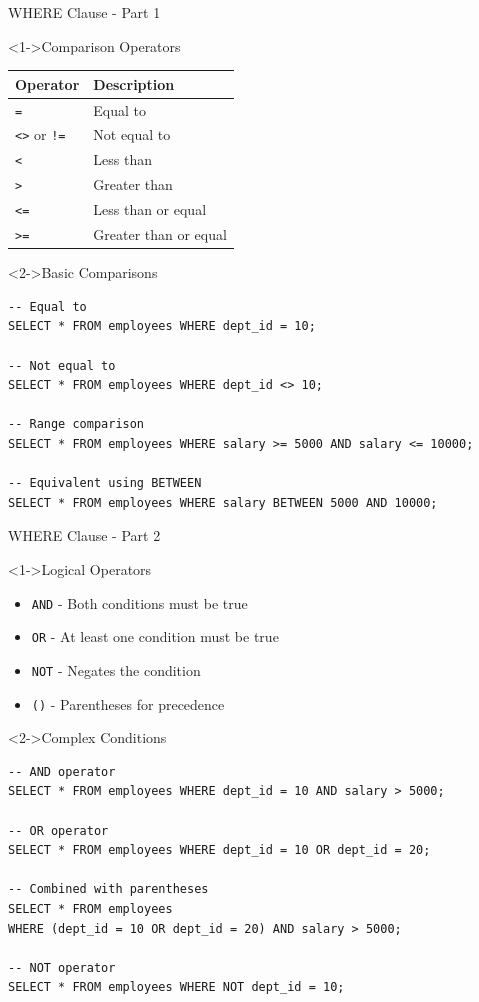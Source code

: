 \documentclass[aspectratio=169,11pt]{beamer}
\begin{document}
\begin{frame}[fragile]{WHERE Clause - Part 1}
\begin{block}<1->{Comparison Operators}
\begin{center}
\begin{tabular}{ll}
\toprule
\textbf{Operator} & \textbf{Description} \\
\midrule
\texttt{=} & Equal to \\
\texttt{<>} or \texttt{!=} & Not equal to \\
\texttt{<} & Less than \\
\texttt{>} & Greater than \\
\texttt{<=} & Less than or equal \\
\texttt{>=} & Greater than or equal \\
\bottomrule
\end{tabular}
\end{center}
\end{block}

\pause
\begin{exampleblock}<2->{Basic Comparisons}
\begin{lstlisting}
-- Equal to
SELECT * FROM employees WHERE dept_id = 10;

-- Not equal to
SELECT * FROM employees WHERE dept_id <> 10;

-- Range comparison
SELECT * FROM employees WHERE salary >= 5000 AND salary <= 10000;

-- Equivalent using BETWEEN
SELECT * FROM employees WHERE salary BETWEEN 5000 AND 10000;
\end{lstlisting}
\end{exampleblock}
\end{frame}

\begin{frame}[fragile]{WHERE Clause - Part 2}
\begin{block}<1->{Logical Operators}
\begin{itemize}
    \item \texttt{AND} - Both conditions must be true
    \item \texttt{OR} - At least one condition must be true
    \item \texttt{NOT} - Negates the condition
    \item \texttt{()} - Parentheses for precedence
\end{itemize}
\end{block}

\pause
\begin{exampleblock}<2->{Complex Conditions}
\begin{lstlisting}
-- AND operator
SELECT * FROM employees WHERE dept_id = 10 AND salary > 5000;

-- OR operator
SELECT * FROM employees WHERE dept_id = 10 OR dept_id = 20;

-- Combined with parentheses
SELECT * FROM employees 
WHERE (dept_id = 10 OR dept_id = 20) AND salary > 5000;

-- NOT operator
SELECT * FROM employees WHERE NOT dept_id = 10;
\end{lstlisting}
\end{exampleblock}
\end{frame}
\end{document}
